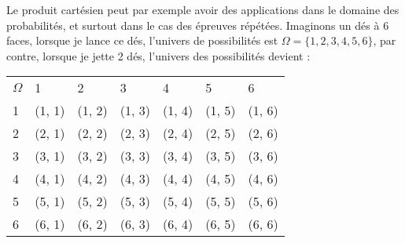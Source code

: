 \begin{myrem}
  Le produit cartésien peut par exemple avoir des applications dans le domaine des probabilités, et surtout dans le cas des épreuves répétées. Imaginons un dés à 6 faces, lorsque je lance ce dés, l'univers de possibilités est $\Omega = \{1,2,3,4,5,6\}$, par contre, lorsque je jette 2 dés, l'univers des possibilités devient :
  \begin{center}
      \begin{tabular}{lllllll}
        $\Omega$ &       1 &       2 &       3 &       4 &       5 &       6 \\
        1 &  (1, 1) &  (1, 2) &  (1, 3) &  (1, 4) &  (1, 5) &  (1, 6) \\
        2 &  (2, 1) &  (2, 2) &  (2, 3) &  (2, 4) &  (2, 5) &  (2, 6) \\
        3 &  (3, 1) &  (3, 2) &  (3, 3) &  (3, 4) &  (3, 5) &  (3, 6) \\
        4 &  (4, 1) &  (4, 2) &  (4, 3) &  (4, 4) &  (4, 5) &  (4, 6) \\
        5 &  (5, 1) &  (5, 2) &  (5, 3) &  (5, 4) &  (5, 5) &  (5, 6) \\
        6 &  (6, 1) &  (6, 2) &  (6, 3) &  (6, 4) &  (6, 5) &  (6, 6) \\
      \end{tabular}
  \end{center}
\end{myrem}

